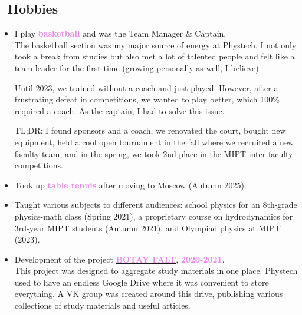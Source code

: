 \documentclass[a4paper,12pt]{article}
\begin{document}
	\subsection*{\faHeart\ Hobbies}
	\begin{itemize}
		\item I play \textcolor{violet}{\textbf{basketball}} and was the Team Manager \& Captain. \\
		The basketball section was my major source of energy at Phystech. I not only took a break from studies but also met a lot of talented people and felt like a team leader for the first time (growing personally as well, I believe).
		
		Until 2023, we trained without a coach and just played. However, after a frustrating defeat in competitions, we wanted to play better, which 100\% required a coach. As the captain, I had to solve this issue. 
		
		TL;DR: I found sponsors and a coach, we renovated the court, bought new equipment, held a cool open tournament in the fall where we recruited a new faculty team, and in the spring, we took 2nd place in the MIPT inter-faculty competitions.
		
		\item Took up \textcolor{violet}{\textbf{table tennis}} after moving to Moscow
		(Autumn 2025).
		
		\item Taught various subjects to different audiences: school physics for an 8th-grade physics-math class (Spring 2021), a proprietary course on hydrodynamics for 3rd-year MIPT students (Autumn 2021), and Olympiad physics at MIPT (2023).
		
		\item Development of the project \href{https://vk.com/botay_falt}{\textcolor{violet}{\textbf{BOTAY FALT}}}, \textcolor{violet}{\textbf{2020-2021}}. \\
		This project was designed to aggregate study materials in one place. Phystech used to have an endless Google Drive where it was convenient to store everything. A VK group was created around this drive, publishing various collections of study materials and useful articles.
	\end{itemize}
\end{document}
